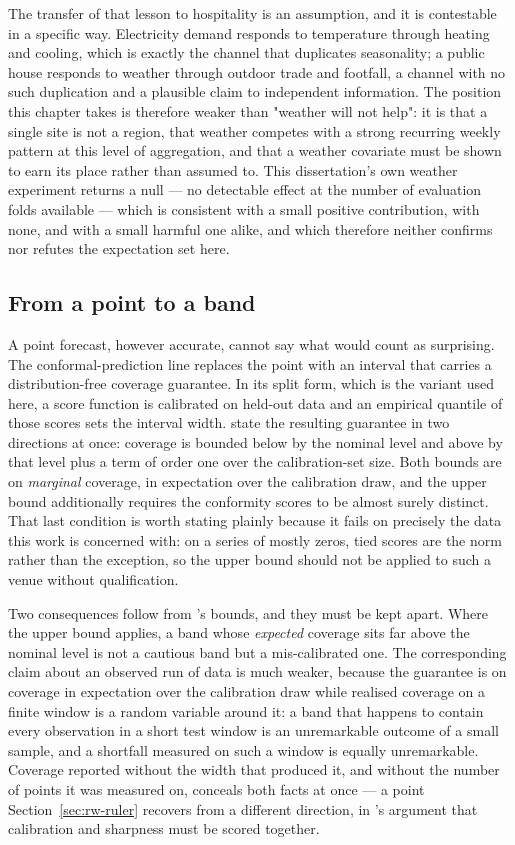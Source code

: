 The transfer of that lesson to hospitality is an assumption, and it is
contestable in a specific way. Electricity demand responds to temperature
through heating and cooling, which is exactly the channel that duplicates
seasonality; a public house responds to weather through outdoor trade and
footfall, a channel with no such duplication and a plausible claim to
independent information. The position this chapter takes is therefore weaker
than "weather will not help": it is that a single site is not a region, that
weather competes with a strong recurring weekly pattern at this level of
aggregation, and that a weather covariate must be shown to earn its place
rather than assumed to. This dissertation's own weather experiment returns a
null --- no detectable effect at the number of evaluation folds available ---
which is consistent with a small positive contribution, with none, and with a
small harmful one alike, and which therefore neither confirms nor refutes the
expectation set here.

\subsection*{From a point to a band}

A point forecast, however accurate, cannot say what would count as surprising.
The conformal-prediction line replaces the point with an interval that carries
a distribution-free coverage guarantee. In its split form, which is the
variant used here, a score function is calibrated on held-out data and an
empirical quantile of those scores sets the interval width.
\citet{angelopoulos_conformal_2023} state the resulting guarantee in two
directions at once: coverage is bounded below by the nominal level and above
by that level plus a term of order one over the calibration-set size. Both
bounds are on \emph{marginal} coverage, in expectation over the calibration
draw, and the upper bound additionally requires the conformity scores to be
almost surely distinct. That last condition is worth stating plainly because it
fails on precisely the data this work is concerned with: on a series of mostly
zeros, tied scores are the norm rather than the exception, so the upper bound
should not be applied to such a venue without qualification.

Two consequences follow from \citeauthor{angelopoulos_conformal_2023}'s bounds,
and they must be kept apart. Where the upper bound applies, a band whose
\emph{expected} coverage sits far above the nominal level is not a cautious
band but a mis-calibrated one. The corresponding claim about an observed run of
data is much weaker, because the guarantee is on coverage in expectation over
the calibration draw while realised coverage on a finite window is a random
variable around it: a band that happens to contain every observation in a short
test window is an unremarkable outcome of a small sample, and a shortfall
measured on such a window is equally unremarkable. Coverage reported without
the width that produced it, and without the number of points it was measured
on, conceals both facts at once --- a point Section~\ref{sec:rw-ruler} recovers
from a different direction, in \citeauthor{kolassa_evaluating_2016}'s argument
that calibration and sharpness must be scored together.

